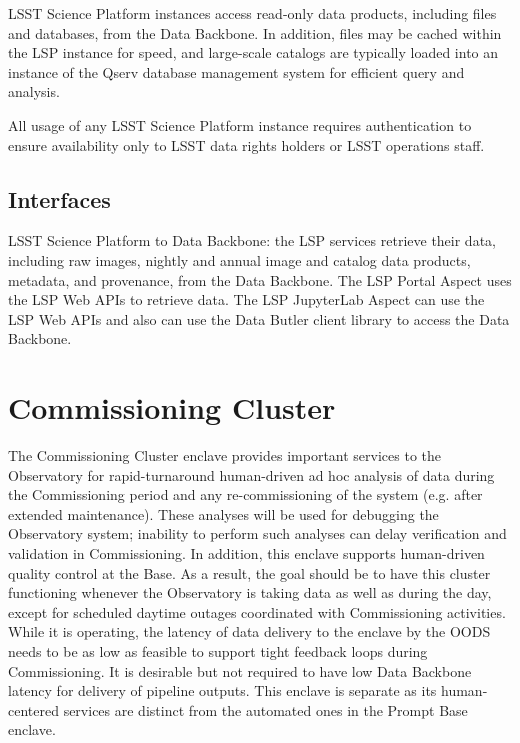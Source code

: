 \documentclass[DM,toc]{lsstdoc}
\begin{document}
LSST Science Platform instances access read-only data products, including files and databases, from the Data Backbone.
In addition, files may be cached within the LSP instance for speed, and large-scale catalogs are typically loaded into an instance of the Qserv database management system for efficient query and analysis.

All usage of any LSST Science Platform instance requires authentication
to ensure availability only to LSST data rights holders or LSST
operations staff.

\subsection{Interfaces}\label{dac-interfaces}

LSST Science Platform to Data Backbone: the LSP services retrieve their data, including raw images, nightly and
annual image and catalog data products, metadata, and provenance, from the Data
Backbone.  The LSP Portal Aspect uses the LSP Web APIs to retrieve data.  The
LSP JupyterLab Aspect can use the LSP Web APIs and also can use the Data Butler
client library to access the Data Backbone.


\section{Commissioning Cluster}\label{commissioning-cluster}

The Commissioning Cluster enclave provides important services to the Observatory for rapid-turnaround human-driven ad hoc analysis of data during the Commissioning period and any re-commissioning of the system (e.g. after extended maintenance).
These analyses will be used for debugging the Observatory system; inability to perform such analyses can delay verification and validation in Commissioning.
In addition, this enclave supports human-driven quality control at the Base.
As a result, the goal should be to have this cluster functioning whenever the Observatory is taking data as well as during the day, except for scheduled daytime outages coordinated with Commissioning activities.
While it is operating, the latency of data delivery to the enclave by the OODS needs to be as low as feasible to support tight feedback loops during Commissioning.
It is desirable but not required to have low Data Backbone latency for delivery of pipeline outputs.
This enclave is separate as its human-centered services are distinct from the automated ones in the Prompt Base enclave.
\end{document}
